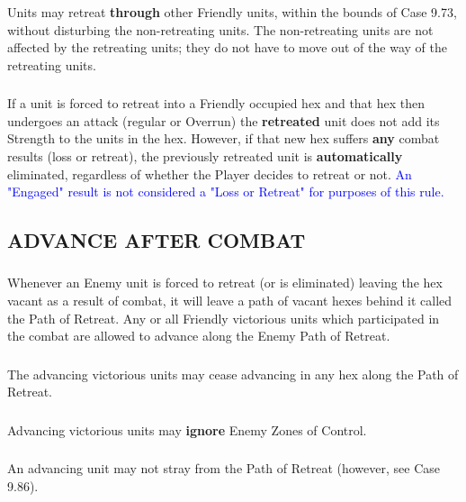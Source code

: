 \subsubsection{} Units may retreat \textbf{through} other Friendly units, within the bounds of Case 9.73, without disturbing the non-retreating units. The non-retreating units are not affected by the retreating units; they do not have to move out of the way of the retreating units.

\subsubsection{} If a unit is forced to retreat into a Friendly occupied hex and that hex then undergoes an attack (regular or Overrun) the \textbf{retreated} unit does not add its Strength to the units in the hex. However, if that new hex suffers \textbf{any} combat results (loss or retreat), the previously retreated unit is \textbf{automatically} eliminated, regardless of whether the Player decides to retreat or not. \textcolor{blue}{An "Engaged" result is not considered a "Loss or Retreat" for purposes of this rule.}

\subsection{ADVANCE AFTER COMBAT}

\subsubsection{} Whenever an Enemy unit is forced to retreat (or is eliminated) leaving the hex vacant as a result of combat, it will leave a path of vacant hexes behind it called the Path of Retreat. Any or all Friendly victorious units which participated in the combat are allowed to advance along the Enemy Path of Retreat.

\subsubsection{} The advancing victorious units may cease advancing in any hex along the Path of Retreat.

\subsubsection{} Advancing victorious units may \textbf{ignore} Enemy Zones of Control.

\subsubsection{} An advancing unit may not stray from the Path of Retreat (however, see Case 9.86).

